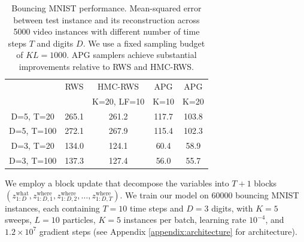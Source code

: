\documentclass{article}
\theoremstyle{definition}
\begin{document}
\begin{table}[t!]
    \centering
    \caption{Bouncing MNIST performance. Mean-squared error between test instance and its reconstruction across 5000 video instances with different number of time steps $T$ and digits $D$. We use a fixed sampling budget of $KL=1000$. APG samplers achieve substantial improvements relative to RWS and HMC-RWS.}
    \vspace{0.5em}
    \begin{tabularx}{\columnwidth}{ccccc}
    \toprule
        & RWS & HMC-RWS & APG & APG \\
        &  &  K=20, LF=10 & K=10 & K=20 \\
    \midrule
    D=5, T=20 & 265.1 & 261.2 & 117.7 & 103.8\\
    \hspace{0.5em}D=5, T=100 & 272.1 & 267.9  & 115.4 &  102.3\\
    D=3, T=20 & 134.0 & 124.1 & 60.4 & 58.9 \\   
    \hspace{0.5em}D=3, T=100 & 137.3 & 127.4 & 56.0 & 55.7 \\
    
    \bottomrule
    \end{tabularx}
    \vspace{-1em}
    \label{table:mse-bmnist}
\end{table}

We employ a block update that decompose the variables into $T + 1$ blocks $(z_{1:D}^{\mathrm{what}}, z_{1:D, 1}^{\mathrm{where}}, z_{1:D, 2}^{\mathrm{where}}, \dotsc, z_{1:D, T}^{\mathrm{where}})$.
We train our model on 60000 bouncing MNIST instances, each containing $T=10$ time steps and $D=3$ digits, with $K=5$ sweeps, $L=10$ particles, $K=5$ instances per batch, learning rate $10^{-4}$, and $1.2\times10^7$ gradient steps (see Appendix \ref{appendix:architecture} for architecture).
\end{document}
